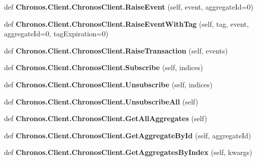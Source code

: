 \begin{DoxyCompactItemize}
\item 
def {\bfseries Chronos.\+Client.\+Chronos\+Client.\+Raise\+Event} (self, event, aggregate\+Id=0)\hypertarget{group__Chronos_ga7ece304e933c194999a3eef64caff1ad}{}\label{group__Chronos_ga7ece304e933c194999a3eef64caff1ad}

\item 
def {\bfseries Chronos.\+Client.\+Chronos\+Client.\+Raise\+Event\+With\+Tag} (self, tag, event, aggregate\+Id=0, tag\+Expiration=0)\hypertarget{group__Chronos_ga6d8b1a0844d2aea778d0492df9786c12}{}\label{group__Chronos_ga6d8b1a0844d2aea778d0492df9786c12}

\item 
def {\bfseries Chronos.\+Client.\+Chronos\+Client.\+Raise\+Transaction} (self, events)\hypertarget{group__Chronos_gae06f129649015ff3711d145214c136e5}{}\label{group__Chronos_gae06f129649015ff3711d145214c136e5}

\item 
def {\bfseries Chronos.\+Client.\+Chronos\+Client.\+Subscribe} (self, indices)\hypertarget{group__Chronos_gab56771863749deaf2f638ef64f15aa5c}{}\label{group__Chronos_gab56771863749deaf2f638ef64f15aa5c}

\item 
def {\bfseries Chronos.\+Client.\+Chronos\+Client.\+Unsubscribe} (self, indices)\hypertarget{group__Chronos_gaaf30014e6177a300f5e1b7dc3ad140b6}{}\label{group__Chronos_gaaf30014e6177a300f5e1b7dc3ad140b6}

\item 
def {\bfseries Chronos.\+Client.\+Chronos\+Client.\+Unsubscribe\+All} (self)\hypertarget{group__Chronos_ga5bcfb753c374822e39e99df3a2ca6724}{}\label{group__Chronos_ga5bcfb753c374822e39e99df3a2ca6724}

\item 
def {\bfseries Chronos.\+Client.\+Chronos\+Client.\+Get\+All\+Aggregates} (self)\hypertarget{group__Chronos_ga5e6b70c02dd62f6d5208cdab995cc19c}{}\label{group__Chronos_ga5e6b70c02dd62f6d5208cdab995cc19c}

\item 
def {\bfseries Chronos.\+Client.\+Chronos\+Client.\+Get\+Aggregate\+By\+Id} (self, aggregate\+Id)\hypertarget{group__Chronos_ga3413c60fdd905f907b4693fc8be45e1e}{}\label{group__Chronos_ga3413c60fdd905f907b4693fc8be45e1e}

\item 
def {\bfseries Chronos.\+Client.\+Chronos\+Client.\+Get\+Aggregates\+By\+Index} (self, kwargs)\hypertarget{group__Chronos_ga80c03b56fa6301dc0f0ba6ad3de592da}{}\label{group__Chronos_ga80c03b56fa6301dc0f0ba6ad3de592da}


\end{DoxyCompactItemize}
